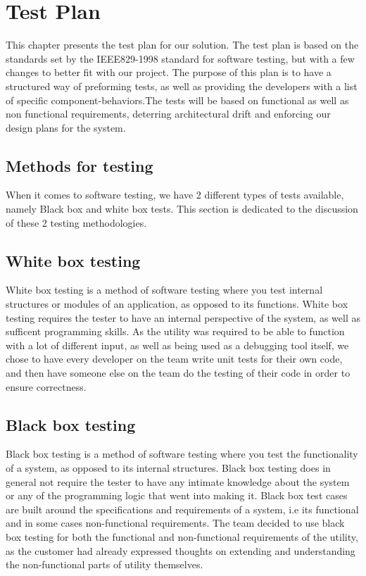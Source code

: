 \chapter{Test Plan}
This chapter presents the test plan for our solution. The test plan is based on
the standards set by the IEEE829-1998 standard for software testing, but with a
few changes to better fit with our project. The purpose of this plan is to have
a structured way of preforming tests, as well as providing the developers with
a list of specific component-behaviors.The tests will be based on functional as
well as non functional requirements, deterring architectural drift and
enforcing our design plans for the system.

\section{Methods for testing}
When it comes to software testing, we have 2 different types of tests available, namely Black box and white box tests. This section is dedicated to the discussion of these 2 testing methodologies.

\section{White box testing}
White box testing is a method of software testing where you test internal structures or modules of an application, as opposed to its functions. White box testing requires the tester to have an internal perspective of the system, as well as sufficent programming skills. As the utility was required to be able to function with a lot of different input, as well as being used as a debugging tool itself, we chose to have every developer on the team write unit tests for their own code, and then have someone else on the team do the testing of their code in order to ensure correctness.

\section{Black box testing}
Black box testing is a method of software testing where you test the functionality of a system, as opposed to its internal structures. Black box testing does in general not require the tester to have any intimate knowledge about the system or any of the programming logic that went into making it. Black box test cases are built around the specifications and requirements of a system, i.e its functional and in some cases non-functional requirements. The team decided to use black box testing for both the functional and non-functional requirements of the utility, as the customer had already expressed thoughts on extending and understanding the non-functional parts of utility themselves. 


